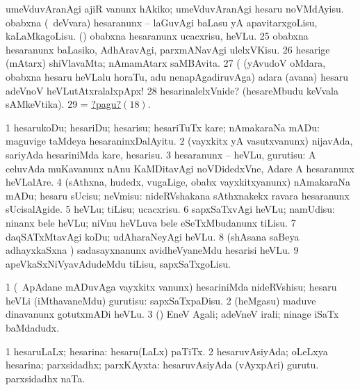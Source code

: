  
\banum
{} umeVduvAranAgi ajiR \mo vanunx hAkiko; umeVduvAranAgi hesaru noVMdAyisu. 
\eanum
\numie
{}  
\banum
{} obabxna (\kanmu\ deVvara) hesaranunx -- laGuvAgi baLasu yA apavitarxgoLisu, kaLaMkagoLisu. 
 (\hA) obabxna hesaranunx ucacxrisu, heVLu. 
\eanum
\numie
\num{25}  obabxna hesaranunx baLasiko, AdhAravAgi, parxmANavAgi ulelxVKisu. 
\num{26}  hesarige (mAtarx) shiVlavaMta; nAmamAtarx saMBAvita. 
\num{27}  (  (yAvudoV oMdara, obabxna hesaru heVLalu horaTu, adu nenapAgadiruvAga)  adara (avana) hesaru adeVnoV heVLutAtxralalxpApx! 
\num{28}  hesarinalelxVnide? (hesareMbudu keVvala sAMkeVtika). 
\num{29}  = \hyperlink{name1pagu18}{?pagu?\((18)\)}. 
\enum
\emng
\eentry

\bentry
{}
\gl{\sakirx}
\bmng
\bnum
\num{1} hesarukoDu; hesariDu; hesarisu; hesariTuTx kare; nAmakaraNa mADu:  maguvige taMdeya hesaraninxDalAyitu. 
\num{2} (vayxkitx yA vasutxvanunx) nijavAda, sariyAda hesariniMda kare, hesarisu. 
\num{3} hesaranunx -- heVLu, gurutisu:  A celuvAda muKavanunx nAnu KaMDitavAgi noVDidedxVne, Adare A hesaranunx heVLalAre. 
\num{4} (sAthxna, hudedx, \mo vugaLige, obabx vayxkitxyanunx) nAmakaraNa mADu; hesaru sUcisu; neVmisu:  nideRVshakana sAthxnakekx ravara hesaranunx sUcisalAgide. 
\num{5} heVLu; tiLisu; ucacxrisu. 
\num{6} sapxSaTxvAgi heVLu; namUdisu:  ninanx bele heVLu; niVnu heVLuva bele eSeTxMbudanunx tiLisu. 
\num{7} daqSATxMtavAgi koDu; udAharaNeyAgi heVLu. 
\num{8} (shAsana saBeya adhayxkaSxna \vi) sadasayxnanunx avidheVyaneMdu hesarisi heVLu. 
\num{9} apeVkaSxNiVyavAdudeMdu tiLisu, sapxSaTxgoLisu. 
\enum
\emng

\noindent
\gl{\pagu}
\bmng
\bnum
\num{1}  (\kanmu\ ApAdane mADuvAga vayxkitx \mo vanunx) hesariniMda nideRVshisu; hesaru heVLi (iMthavaneMdu) gurutisu: sapxSaTxpaDisu. 
\num{2}  (heMgasu) maduve dinavanunx gotutxmADi heVLu. 
\num{3}  (\AmA) EneV Agali; adeVneV irali; ninage iSaTx baMdadudx. 
\enum
\emng
\eentry

\bentry
{}
\gl{\gu}
\bmng
\bnum
\num{1} hesaruLaLx; hesarina:  hesaru(LaLx) paTiTx. 
\num{2} hesaruvAsiyAda; oLeLxya hesarina; parxsidadhx; parxKAyxta:  hesaruvAsiyAda (vAyxpAri) gurutu.  parxsidadhx naTa. 
\enum
\emng
\eentry

